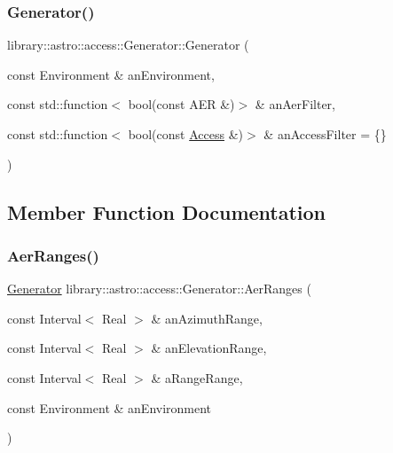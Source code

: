 \subsubsection{\texorpdfstring{Generator()}{Generator()}\hspace{0.1cm}{\footnotesize\ttfamily [2/2]}}
{\footnotesize\ttfamily library\+::astro\+::access\+::\+Generator\+::\+Generator (\begin{DoxyParamCaption}\item[{const Environment \&}]{an\+Environment,  }\item[{const std\+::function$<$ bool(const A\+ER \&)$>$ \&}]{an\+Aer\+Filter,  }\item[{const std\+::function$<$ bool(const \hyperlink{classlibrary_1_1astro_1_1_access}{Access} \&)$>$ \&}]{an\+Access\+Filter = {\ttfamily \{\}} }\end{DoxyParamCaption})}



\subsection{Member Function Documentation}
\mbox{\label{classlibrary_1_1astro_1_1access_1_1_generator_ae81c6cc620f00a2318eb3dd3d9d62ce0}} 
\subsubsection{\texorpdfstring{Aer\+Ranges()}{AerRanges()}}
{\footnotesize\ttfamily \hyperlink{classlibrary_1_1astro_1_1access_1_1_generator}{Generator} library\+::astro\+::access\+::\+Generator\+::\+Aer\+Ranges (\begin{DoxyParamCaption}\item[{const Interval$<$ Real $>$ \&}]{an\+Azimuth\+Range,  }\item[{const Interval$<$ Real $>$ \&}]{an\+Elevation\+Range,  }\item[{const Interval$<$ Real $>$ \&}]{a\+Range\+Range,  }\item[{const Environment \&}]{an\+Environment }\end{DoxyParamCaption})\hspace{0.3cm}{\ttfamily [static]}}



